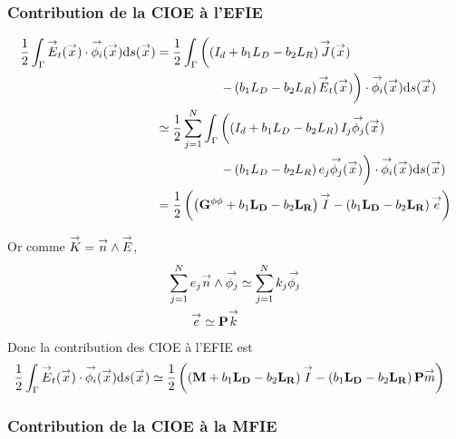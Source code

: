     \subsubsection{Contribution de la CIOE à l'EFIE}

      \begin{equation}
        \begin{aligned}
          \frac{1}{2} \int_\Gamma \vE_t(\vx) \cdot \phii(\vx) \dd{s}(\vx)
          &= \frac{1}{2} \int_\Gamma  \left( \left(I_d + b_1 L_D - b_2 L_R\right) \vJ (\vx)\right.
          \\
          & \hspace{5em} \left.  - \left( b_1 L_D - b_2 L_R\right) \vE_t (\vx) \right) \cdot \phii(\vx) \dd{s}(\vx)
          \\
          & \simeq \frac{1}{2} \sum_{j=1}^N \int_\Gamma \left( \left(I_d + b_1 L_D - b_2 L_R\right) I_j \phij (\vx)\right.
          \\
          & \hspace{5em} \left.  - \left( b_1 L_D - b_2 L_R\right) e_j \phij (\vx) \right) \cdot \phii(\vx) \dd{s}(\vx)
          \\
          & = \frac{1}{2} \left( \left(\mG{\phi}{\phi} + b_1 \mLD - b_2 \mLR\right) \vect{I}  - \left( b_1 \mLD - b_2 \mLR\right) \vect{e}\right)
        \end{aligned}
      \end{equation}

      Or comme \(\vK = \vn \pvect \vE\),
      \begin{equation}
        \begin{aligned}
        \sum_{j=1}^N e_j \vn \pvect \phij & \simeq \sum_{j=1}^N k_j \phij
        \\
        \vect{e} \simeq \mPP \vect{k}
        \end{aligned}
      \end{equation}
      Donc la contribution des CIOE à l'EFIE est
      \begin{equation}
        \begin{aligned}
          \frac{1}{2} \int_\Gamma \vE_t(\vx) \cdot \phii(\vx) \dd{s}(\vx)
          & \simeq \frac{1}{2} \left( \left(\mM + b_1 \mLD - b_2 \mLR\right) \vect{I}  - \left( b_1 \mLD - b_2 \mLR\right) \mPP \vect{m}\right)
        \end{aligned}
      \end{equation}

    \subsubsection{Contribution de la CIOE à la MFIE}

